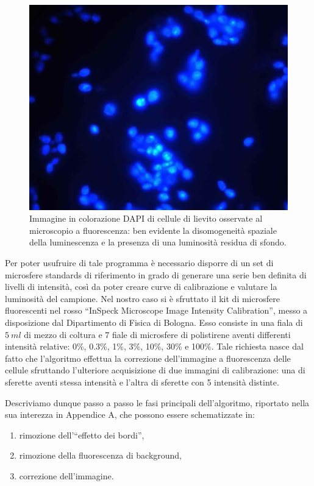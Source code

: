 \begin{figure}
 \centering
 \includegraphics[scale=.55]{img/CAP3bordi.jpg}
 \caption{\small{Immagine in colorazione DAPI di cellule di lievito osservate al microscopio a fluorescenza: ben evidente la disomogeneità spaziale della luminescenza e la presenza di una luminosità residua di sfondo.}}
 \label{fig:bordi}
\end{figure}

Per poter usufruire di tale programma è necessario disporre di un set di microsfere standards di riferimento in grado di generare una serie ben definita di livelli di intensità, così da poter creare curve di calibrazione e valutare la luminosità del campione. 
Nel nostro caso si è sfruttato il kit di microsfere fluorescenti nel rosso ``InSpeck Microscope Image Intensity Calibration'', messo a disposizione dal Dipartimento di Fisica di Bologna. 
Esso consiste in una fiala di $5\ ml$ di mezzo di coltura e 7 fiale di microsfere di polistirene aventi differenti intensità relative: 0\%, 0.3\%, 1\%, 3\%, 10\%, 30\% e 100\%.
Tale richiesta nasce dal fatto che l'algoritmo effettua la correzione dell'immagine a fluorescenza delle cellule sfruttando l'ulteriore acquisizione di due immagini di calibrazione: una di sferette aventi stessa intensità e l'altra di sferette con 5 intensità distinte.

Descriviamo dunque passo a passo le fasi principali dell'algoritmo, riportato nella sua interezza in Appendice A, che possono essere schematizzate in:
\begin{enumerate}
 \item rimozione dell'``effetto dei bordi'',
 \item rimozione della fluorescenza di background,
 \item correzione dell'immagine.
\end{enumerate}


